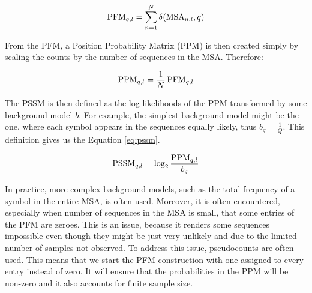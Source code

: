 \begin{equation}
    \operatorname{PFM}_{q, l} = \sum_{n = 1}^{N} \delta(\operatorname{MSA}_{n, l}, q)
    \label{eq:pfm}
\end{equation}

From the PFM, a Position Probability Matrix (PPM) is then created simply by scaling the counts by the number of sequences in the MSA.
Therefore:

\begin{equation}
    \operatorname{PPM}_{q, l} = \frac{1}{N} \operatorname{PFM}_{q, l}
\end{equation}

The PSSM is then defined as the log likelihoods of the PPM transformed by some background model $b$.
For example, the simplest background model might be the one, where each symbol appears in the sequences equally likely, thus $b_q = \frac{1}{Q}$.
This definition gives us the Equation \ref{eq:pssm}.

\begin{equation}
    \operatorname{PSSM}_{q, l} = \log_2 \frac{\operatorname{PPM}_{q, l}}{b_q}
    \label{eq:pssm}
\end{equation}

In practice, more complex background models, such as the total frequency of a symbol in the entire MSA, is often used.
Moreover, it is often encountered, especially when number of sequences in the MSA is small, that some entries of the PFM are zeroes.
This is an issue, because it renders some sequences impossible even though they might be just very unlikely and due to the limited number of samples not observed.
To address this issue, pseudocounts are often used.
This means that we start the PFM construction with one assigned to every entry instead of zero.
It will ensure that the probabilities in the PPM will be non-zero and it also accounts for finite sample size.


        

        
